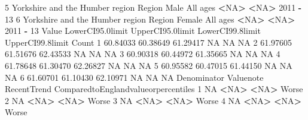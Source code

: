 \documentclass[]{book}
\newenvironment{Shaded}{\begin{snugshade}}{\end{snugshade}}
\newcommand{\DecValTok}[1]{\textcolor[rgb]{0.00,0.00,0.81}{#1}}
\newcommand{\ErrorTok}[1]{\textcolor[rgb]{0.64,0.00,0.00}{\textbf{#1}}}
\newcommand{\FloatTok}[1]{\textcolor[rgb]{0.00,0.00,0.81}{#1}}
\newcommand{\NormalTok}[1]{#1}
\newcommand{\OperatorTok}[1]{\textcolor[rgb]{0.81,0.36,0.00}{\textbf{#1}}}
\newcommand{\OtherTok}[1]{\textcolor[rgb]{0.56,0.35,0.01}{#1}}
\newcommand{\StringTok}[1]{\textcolor[rgb]{0.31,0.60,0.02}{#1}}
\begin{document}
\begin{Shaded}
\begin{Highlighting}[]
{\DecValTok{5}\NormalTok{ Yorkshire and the Humber region   Region   Male All ages         }\OperatorTok{<}\OtherTok{NA}\OperatorTok{>}\StringTok{     }\ErrorTok{<}\OtherTok{NA}\OperatorTok{>}\StringTok{  }\DecValTok{2011} \OperatorTok{-}\StringTok{ }\DecValTok{13}
\DecValTok{6}\NormalTok{ Yorkshire and the Humber region   Region Female All ages         }\OperatorTok{<}\OtherTok{NA}\OperatorTok{>}\StringTok{     }\ErrorTok{<}\OtherTok{NA}\OperatorTok{>}\StringTok{  }\DecValTok{2011} \OperatorTok{-}\StringTok{ }\DecValTok{13}
\NormalTok{     Value LowerCI95}\FloatTok{.0}\NormalTok{limit UpperCI95}\FloatTok{.0}\NormalTok{limit LowerCI99}\FloatTok{.8}\NormalTok{limit UpperCI99}\FloatTok{.8}\NormalTok{limit Count}
\DecValTok{1} \FloatTok{60.84033}         \FloatTok{60.38649}         \FloatTok{61.29417}               \OtherTok{NA}               \OtherTok{NA}    \OtherTok{NA}
\DecValTok{2} \FloatTok{61.97605}         \FloatTok{61.51676}         \FloatTok{62.43533}               \OtherTok{NA}               \OtherTok{NA}    \OtherTok{NA}
\DecValTok{3} \FloatTok{60.90318}         \FloatTok{60.44972}         \FloatTok{61.35665}               \OtherTok{NA}               \OtherTok{NA}    \OtherTok{NA}
\DecValTok{4} \FloatTok{61.78648}         \FloatTok{61.30470}         \FloatTok{62.26827}               \OtherTok{NA}               \OtherTok{NA}    \OtherTok{NA}
\DecValTok{5} \FloatTok{60.95582}         \FloatTok{60.47015}         \FloatTok{61.44150}               \OtherTok{NA}               \OtherTok{NA}    \OtherTok{NA}
\DecValTok{6} \FloatTok{61.60701}         \FloatTok{61.10430}         \FloatTok{62.10971}               \OtherTok{NA}               \OtherTok{NA}    \OtherTok{NA}
\NormalTok{  Denominator Valuenote RecentTrend ComparedtoEnglandvalueorpercentiles}
\DecValTok{1}          \OtherTok{NA}      \OperatorTok{<}\OtherTok{NA}\OperatorTok{>}\StringTok{        }\ErrorTok{<}\OtherTok{NA}\OperatorTok{>}\StringTok{                               }\NormalTok{Worse}
\DecValTok{2}          \OtherTok{NA}      \OperatorTok{<}\OtherTok{NA}\OperatorTok{>}\StringTok{        }\ErrorTok{<}\OtherTok{NA}\OperatorTok{>}\StringTok{                               }\NormalTok{Worse}
\DecValTok{3}          \OtherTok{NA}      \OperatorTok{<}\OtherTok{NA}\OperatorTok{>}\StringTok{        }\ErrorTok{<}\OtherTok{NA}\OperatorTok{>}\StringTok{                               }\NormalTok{Worse}
\DecValTok{4}          \OtherTok{NA}      \OperatorTok{<}\OtherTok{NA}\OperatorTok{>}\StringTok{        }\ErrorTok{<}\OtherTok{NA}\OperatorTok{>}\StringTok{                               }\NormalTok{Worse}
}
\end{Highlighting}
\end{Shaded}
\end{document}
